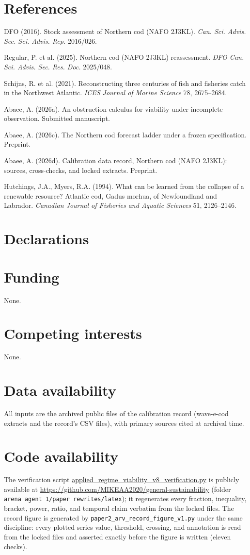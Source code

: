 \documentclass[10pt,twocolumn]{article}
\theoremstyle{plain}
\theoremstyle{remark}
\begin{document}
\section*{References}

{\footnotesize
DFO (2016). Stock assessment of Northern cod (NAFO 2J3KL). \emph{Can.
Sci. Advis. Sec. Sci. Advis. Rep.} 2016/026.

Regular, P. et al. (2025). Northern cod (NAFO 2J3KL) reassessment.
\emph{DFO Can. Sci. Advis. Sec. Res. Doc.} 2025/048.

Schijns, R. et al. (2021). Reconstructing three centuries of fish and
fisheries catch in the Northwest Atlantic. \emph{ICES Journal of Marine
Science} 78, 2675--2684.

Abaee, A. (2026a). An obstruction calculus for viability under
incomplete observation. Submitted manuscript.

Abaee, A. (2026c). The Northern cod forecast ladder under a frozen
specification. Preprint.

Abaee, A. (2026d). Calibration data record, Northern cod (NAFO 2J3KL):
sources, cross-checks, and locked extracts. Preprint.

Hutchings, J.A., Myers, R.A. (1994). What can be learned from the
collapse of a renewable resource? Atlantic cod, Gadus morhua, of
Newfoundland and Labrador. \emph{Canadian Journal of Fisheries and
Aquatic Sciences} 51, 2126--2146.
}

\section*{Declarations}

\section*{Funding}
None.

\section*{Competing interests}
None.

\section*{Data availability}
All inputs are the archived public files of the calibration record
(wave-e-cod extracts and the record's CSV files), with primary sources
cited at archival time.

\section*{Code availability}
The verification script
\url{applied_regime_viability_v8_verification.py}
is publicly available at
\url{https://github.com/MIKEAA2020/general-sustainability} (folder
\texttt{arena agent 1/paper rewrites/latex}); it regenerates every
fraction, inequality, bracket, power, ratio, and temporal claim
verbatim from the locked files. The record figure is generated by
\texttt{paper2\_arv\_record\_figure\_v1.py} under the same discipline:
every plotted series value, threshold, crossing, and annotation is read
from the locked files and asserted exactly before the figure is written
(eleven checks).
\end{document}
